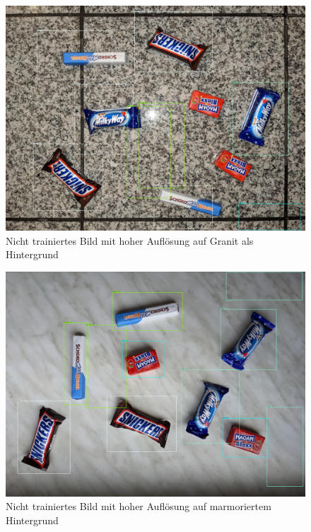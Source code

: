     \begin{figure}[H]
        \centering
        \includegraphics[angle = 90, width = \textwidth]{Bilder/models/model_comparison/ssd_resnet101_v1_fpn_640x640_coco17_tpu-8/HD_on_granite.jpg}
        \caption{Nicht trainiertes Bild mit hoher Auflösung auf Granit als Hintergrund}
    \end{figure}
    
    \begin{figure}[H]
        \centering
        \includegraphics[angle = 90, width = \textwidth]{Bilder/models/model_comparison/ssd_resnet101_v1_fpn_640x640_coco17_tpu-8/HD_on_marble.jpg}
        \caption{Nicht trainiertes Bild mit hoher Auflösung auf marmoriertem Hintergrund}
    \end{figure}
    
